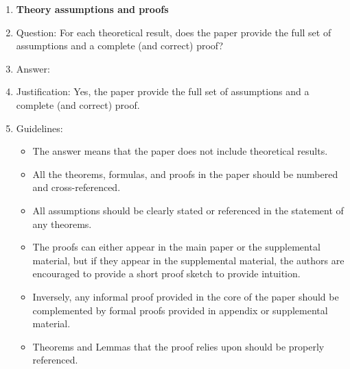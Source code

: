 \documentclass{article}
\theoremstyle{definition}
\theoremstyle{remark}
\begin{document}
\begin{enumerate}
\item {\bf Theory assumptions and proofs}
    \item[] Question: For each theoretical result, does the paper provide the full set of assumptions and a complete (and correct) proof?
    \item[] Answer: \answerYes{} %
    \item[] Justification: Yes,  the paper provide the full set of assumptions and a complete (and correct) proof.
    \item[] Guidelines:
    \begin{itemize}
        \item The answer \answerNA{} means that the paper does not include theoretical results. 
        \item All the theorems, formulas, and proofs in the paper should be numbered and cross-referenced.
        \item All assumptions should be clearly stated or referenced in the statement of any theorems.
        \item The proofs can either appear in the main paper or the supplemental material, but if they appear in the supplemental material, the authors are encouraged to provide a short proof sketch to provide intuition. 
        \item Inversely, any informal proof provided in the core of the paper should be complemented by formal proofs provided in appendix or supplemental material.
        \item Theorems and Lemmas that the proof relies upon should be properly referenced. 
    \end{itemize}


\end{enumerate}
\end{document}

